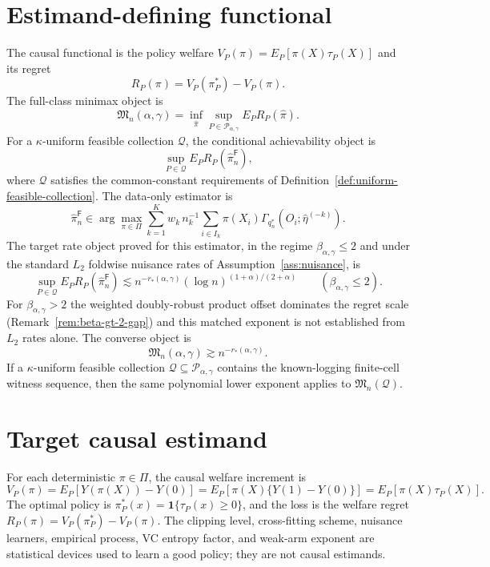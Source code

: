 \documentclass[11pt]{article}
\newcommand{\one}{\mathbf{1}}
\theoremstyle{definition}
\theoremstyle{plain}
\theoremstyle{remark}
\begin{document}
\section{Estimand-defining functional}
The causal functional is the policy welfare \(V_P(\pi)=E_P[\pi(X)\tau_P(X)]\)
and its regret
\[
R_P(\pi)=V_P(\pi_P^*)-V_P(\pi).
\]
The full-class minimax object is
\[
\mathfrak M_n(\alpha,\gamma)
=\inf_{\widehat\pi}
\sup_{P\in\mathcal P_{\alpha,\gamma}}E_P R_P(\widehat\pi).
\]
For a \(\kappa\)-uniform feasible collection \(\mathcal Q\), the conditional
achievability object is
\[
\sup_{P\in\mathcal Q}E_P R_P(\widehat\pi_n^{\mathsf F}),
\]
where \(\mathcal Q\) satisfies the common-constant requirements of
Definition~\ref{def:uniform-feasible-collection}.  The data-only estimator is
\[
\widehat\pi_n^{\mathsf F}
\in\arg\max_{\pi\in\Pi}
\sum_{k=1}^K w_k\,n_k^{-1}\sum_{i\in I_k}
\pi(X_i)\Gamma_{q_n^*}(O_i;\widehat\eta^{(-k)}).
\]
The target rate object proved for this estimator, in the regime
\(\beta_{\alpha,\gamma}\le2\) and under the standard \(L_2\) foldwise nuisance
rates of Assumption~\ref{ass:nuisance}, is
\[
\sup_{P\in\mathcal Q}
E_P R_P(\widehat\pi_n^{\mathsf F})
\lesssim
n^{-r_*(\alpha,\gamma)}(\log n)^{(1+\alpha)/(2+\alpha)}
\qquad(\beta_{\alpha,\gamma}\le2).
\]
For \(\beta_{\alpha,\gamma}>2\) the weighted doubly-robust product offset
dominates the regret scale (Remark~\ref{rem:beta-gt-2-gap}) and this matched
exponent is not established from \(L_2\) rates alone.  The converse object is
\[
\mathfrak M_n(\alpha,\gamma)
\gtrsim n^{-r_*(\alpha,\gamma)}.
\]
If a \(\kappa\)-uniform feasible collection
\(\mathcal Q\subseteq\mathcal P_{\alpha,\gamma}\) contains the known-logging
finite-cell witness sequence, then the same polynomial lower exponent applies
to \(\mathfrak M_n(\mathcal Q)\).

\section{Target causal estimand}
For each deterministic \(\pi\in\Pi\), the causal welfare increment is
\[
V_P(\pi)=E_P[Y(\pi(X))-Y(0)]
=E_P[\pi(X)\{Y(1)-Y(0)\}]
=E_P[\pi(X)\tau_P(X)].
\]
The optimal policy is \(\pi_P^*(x)=\one\{\tau_P(x)\ge0\}\), and the loss is
the welfare regret \(R_P(\pi)=V_P(\pi_P^*)-V_P(\pi)\).  The clipping level,
cross-fitting scheme, nuisance learners, empirical process, VC entropy
factor, and weak-arm exponent are statistical devices used to learn a good
policy; they are not causal estimands.
\end{document}
